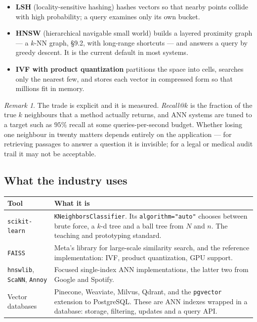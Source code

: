 \documentclass[11pt]{article}
\theoremstyle{plain}
\theoremstyle{definition}
\theoremstyle{remark}
\newtheorem*{rmk}{Remark}
\begin{document}
\begin{itemize}[leftmargin=1.4em,itemsep=4pt]
  \item \textbf{LSH} (locality-sensitive hashing) hashes vectors so that nearby
        points collide with high probability; a query examines only its own
        bucket.
  \item \textbf{HNSW} (hierarchical navigable small world) builds a layered
        proximity graph --- a $k$-NN graph, \S9.2, with long-range shortcuts ---
        and answers a query by greedy descent. It is the current default in most
        systems.
  \item \textbf{IVF with product quantization} partitions the space into cells,
        searches only the nearest few, and stores each vector in compressed form
        so that millions fit in memory.
\end{itemize}

\begin{rmk}
The trade is explicit and it is measured. \emph{Recall@$k$} is the fraction of
the true $k$ neighbours that a method actually returns, and ANN systems are
tuned to a target such as $95\%$ recall at some queries-per-second budget.
Whether losing one neighbour in twenty matters depends entirely on the
application --- for retrieving passages to answer a question it is invisible;
for a legal or medical audit trail it may not be acceptable.
\end{rmk}

\subsection{What the industry uses}
\begin{center}
\renewcommand{\arraystretch}{1.35}
\begin{tabular}{@{}l >{\raggedright\arraybackslash}p{9.0cm}@{}}
\toprule
\textbf{Tool} & \textbf{What it is} \\
\midrule
\texttt{scikit-learn}
  & \texttt{KNeighborsClassifier}. Its \texttt{algorithm="auto"} chooses
    between brute force, a $k$-d tree and a ball tree from $N$ and $n$. The
    teaching and prototyping standard. \\
\texttt{FAISS}
  & Meta's library for large-scale similarity search, and the reference
    implementation: IVF, product quantization, GPU support. \\
\texttt{hnswlib}, \texttt{ScaNN}, \texttt{Annoy}
  & Focused single-index ANN implementations, the latter two from Google and
    Spotify. \\
Vector databases
  & Pinecone, Weaviate, Milvus, Qdrant, and the \texttt{pgvector} extension to
    PostgreSQL. These are ANN indexes wrapped in a database: storage,
    filtering, updates and a query API. \\
\bottomrule
\end{tabular}
\end{center}
\end{document}
